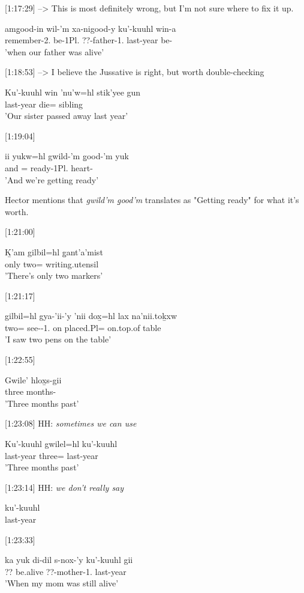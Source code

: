 [1:17:29] --> This is most definitely wrong, but I'm not sure where to fix it up.
\begin{exe}
\ex \gll amg̱ood-in wil-'m xa-nigood-y ku'-kuuhl win-a\\
remember-2.\Ii{} be-1Pl.\Ii{} ??-father-1.\Ii{} last-year be-\Attr{}\\
'when our father was alive'
\end{exe}

[1:18:53] --> I believe the Jussative is right, but worth double-checking
\begin{exe}
\ex \gll Ku'-kuuhl win 'nu'w=hl stik'yee gun\\
last-year \Comp{} die=\Cn{} sibling \Juss{}\\
'Our sister passed away last year'
\end{exe}

[1:19:04]
\begin{exe}
\ex \gll ii yukw=hl gwild-'m g̱ood-'m yuk\\
and \Prog{}=\Cn{} ready-1Pl.\Ii{} heart-\Attr{} \Prog{}\\
'And we're getting ready'
\end{exe}

Hector mentions that \textit{gwild'm g̱ood'm} translates as "Getting ready" for what it's worth.

[1:21:00]
\begin{exe}
\ex \gll Ḵ'am gilbil=hl g̱ant'a'mist\\
only two=\Cn{} writing.utensil\\
'There's only two markers'
\end{exe}

[1:21:17]
\begin{exe}
\ex \gll gilbil=hl gya-'ii-'y 'nii dox̱=hl lax na'nii.toḵxw\\
two=\Cn{} see-\Trn{}-1.\Ii{} on placed.Pl=\Cn{} on.top.of table\\
'I saw two pens on the table'
\end{exe}

[1:22:55]
\begin{exe}
\ex \gll Gwile' hlox̱s-gii\\
three months-\Pst{}\\
'Three months past'
\end{exe}

[1:23:08] HH: \textit{sometimes we can use}
\begin{exe}
\ex \gll Ku'-kuuhl gwilel=hl ku'-kuuhl\\
last-year three=\Cn{} last-year\\
'Three months past'
\end{exe}

[1:23:14] HH: \textit{we don't really say}
\begin{exe}
\ex \gll [\#] ku'-kuuhl \\
[any.number] last-year\\
\end{exe}

[1:23:33]
\begin{exe}
\ex \gll ka yuk di-dil s-nox-'y ku'-kuuhl gii\\
?? \Prog{} be.alive ??-mother-1.\Poss{} last-year \Pst{}\\
'When my mom was still alive'
\end{exe}

